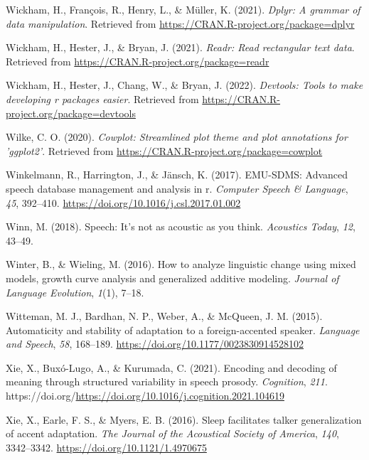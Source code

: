 \documentclass[
  11pt,
  english,
  man,floatsintext]{apa6}
\newlength{\cslhangindent}
\newlength{\cslentryspacingunit} %
\newenvironment{CSLReferences}[2] %
 {%
  \setlength{\parindent}{0pt}
  \ifodd #1
  \let\oldpar\par
  \def\par{\hangindent=\cslhangindent\oldpar}
  \fi
  \setlength{\parskip}{#2\cslentryspacingunit}
 }%
 {}
\begin{document}
\begin{CSLReferences}{1}{0}
\leavevmode{}%
Wickham, H., François, R., Henry, L., \& Müller, K. (2021). \emph{Dplyr: A grammar of data manipulation}. Retrieved from \url{https://CRAN.R-project.org/package=dplyr}

\leavevmode{}%
Wickham, H., Hester, J., \& Bryan, J. (2021). \emph{Readr: Read rectangular text data}. Retrieved from \url{https://CRAN.R-project.org/package=readr}

\leavevmode{}%
Wickham, H., Hester, J., Chang, W., \& Bryan, J. (2022). \emph{Devtools: Tools to make developing r packages easier}. Retrieved from \url{https://CRAN.R-project.org/package=devtools}

\leavevmode{}%
Wilke, C. O. (2020). \emph{Cowplot: Streamlined plot theme and plot annotations for 'ggplot2'}. Retrieved from \url{https://CRAN.R-project.org/package=cowplot}

\leavevmode{}%
Winkelmann, R., Harrington, J., \& Jänsch, K. (2017). EMU-SDMS: Advanced speech database management and analysis in r. \emph{Computer Speech \& Language}, \emph{45}, 392--410. \url{https://doi.org/10.1016/j.csl.2017.01.002}

\leavevmode{}%
Winn, M. (2018). Speech: It's not as acoustic as you think. \emph{Acoustics Today}, \emph{12}, 43--49.

\leavevmode{}%
Winter, B., \& Wieling, M. (2016). How to analyze linguistic change using mixed models, growth curve analysis and generalized additive modeling. \emph{Journal of Language Evolution}, \emph{1}(1), 7--18.

\leavevmode{}%
Witteman, M. J., Bardhan, N. P., Weber, A., \& McQueen, J. M. (2015). Automaticity and stability of adaptation to a foreign-accented speaker. \emph{Language and Speech}, \emph{58}, 168--189. \url{https://doi.org/10.1177/0023830914528102}

\leavevmode{}%
Xie, X., Buxó-Lugo, A., \& Kurumada, C. (2021). Encoding and decoding of meaning through structured variability in speech prosody. \emph{Cognition}, \emph{211}. https://doi.org/\url{https://doi.org/10.1016/j.cognition.2021.104619}

\leavevmode{}%
Xie, X., Earle, F. S., \& Myers, E. B. (2016). Sleep facilitates talker generalization of accent adaptation. \emph{The Journal of the Acoustical Society of America}, \emph{140}, 3342--3342. \url{https://doi.org/10.1121/1.4970675}


\end{CSLReferences}
\end{document}
